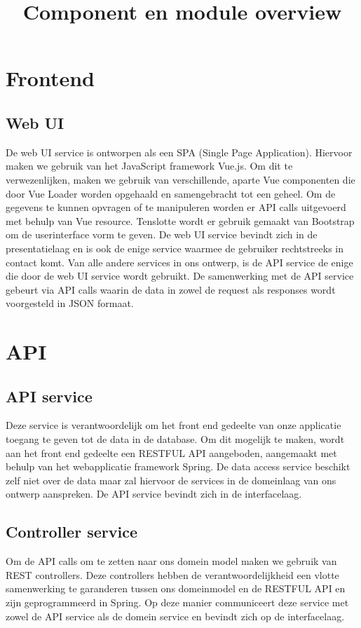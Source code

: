 \documentclass[11pt,openany]{article}
\begin{document}
	\title{Component en module overview}
	\date{}
	\maketitle
	\clearpage
	\section{Frontend}
	\subsection{Web UI}
	De web UI service is ontworpen als een SPA (Single Page Application). Hiervoor maken we gebruik van het JavaScript framework Vue.js. Om dit te verwezenlijken, maken we gebruik van verschillende, aparte Vue componenten die door Vue Loader worden opgehaald en samengebracht tot een geheel. Om de gegevens te kunnen opvragen of te manipuleren worden er API calls uitgevoerd met behulp van Vue resource. Tenslotte wordt er gebruik gemaakt van Bootstrap om de userinterface vorm te geven. De web UI service bevindt zich in de presentatielaag en is ook de enige service waarmee de gebruiker rechtstreeks in contact komt. Van alle andere services in ons ontwerp, is de API service de enige die door de web UI service wordt gebruikt. De samenwerking met de API service gebeurt via API calls waarin de data in zowel de request als responses wordt voorgesteld in JSON formaat.
	\section{API}
	\subsection{API service}
	Deze service is verantwoordelijk om het front end gedeelte van onze applicatie toegang te geven tot de data in de database. Om dit mogelijk te maken, wordt aan het front end gedeelte een RESTFUL API aangeboden, aangemaakt met behulp van het webapplicatie framework Spring. De data access service beschikt zelf niet over de data maar zal hiervoor de services in de domeinlaag van ons ontwerp aanspreken. De API service bevindt zich in de interfacelaag. 
	\subsection{Controller service}
	Om de API calls om te zetten naar ons domein model maken we gebruik van REST controllers. Deze controllers hebben de verantwoordelijkheid een vlotte samenwerking te garanderen tussen ons domeinmodel en de RESTFUL API en zijn geprogrammeerd in Spring. Op deze manier communiceert deze service met zowel de API service als de domein service en bevindt zich op de interfacelaag.
	\newpage
\end{document}
